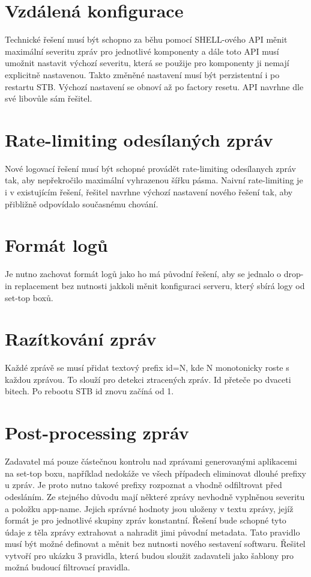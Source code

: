 \documentclass[thesis=B,czech]{FITthesis}[2012/06/26]
\begin{document}
\section*{Vzdálená konfigurace}
Technické řešení musí být schopno za běhu pomocí SHELL-ového API měnit maximální severitu zpráv pro jednotlivé komponenty a dále toto API musí umožnit nastavit výchozí severitu, která se použije pro komponenty ji nemají explicitně nastavenou. Takto změněné nastavení musí být perzistentní i po restartu STB. Výchozí nastavení se obnoví až po factory resetu. API navrhne dle své libovůle sám řešitel.

\section*{Rate-limiting odesílaných zpráv}
Nové logovací řešení musí být schopné provádět rate-limiting odesílanych zpráv tak, aby nepřekročilo maximální vyhrazenou šířku pásma. Naivní rate-limiting je i v existujícím řešení, řešitel navrhne výchozí nastavení nového řešení tak, aby přibližně odpovídalo současnému chování. 

\section*{Formát logů}
Je nutno zachovat formát logů jako ho má původní řešení, aby se jednalo o drop-in replacement bez nutnosti jakkoli měnit konfiguraci serveru, který sbírá logy od set-top boxů.

\section*{Razítkování zpráv}
Každé zprávě se musí přidat textový prefix id=N, kde N monotonicky roste s každou zprávou.  To slouží pro detekci ztracených zpráv. Id přeteče po dvaceti bitech. Po rebootu STB id znovu začíná od 1.

\section*{Post-processing zpráv}
Zadavatel má pouze částečnou kontrolu nad zprávami generovanými aplikacemi na set-top boxu, například nedokáže ve všech případech eliminovat dlouhé prefixy u zpráv. Je proto nutno takové prefixy rozpoznat a vhodně odfiltrovat před odesláním. Ze stejného důvodu mají některé zprávy nevhodně vyplněnou severitu a položku app-name. Jejich správné hodnoty jsou uloženy v textu zprávy, jejíž formát je pro jednotlivé skupiny zpráv konstantní. Řešení bude schopné tyto údaje z těla zprávy extrahovat a nahradit jimi původní metadata. Tato pravidlo musí být možné definovat a měnit bez nutnosti nového sestavení softwaru. 
Řešitel vytvoří pro ukázku 3 pravidla, která budou sloužit zadavateli jako šablony pro možná budoucí filtrovací pravidla.
\end{document}
